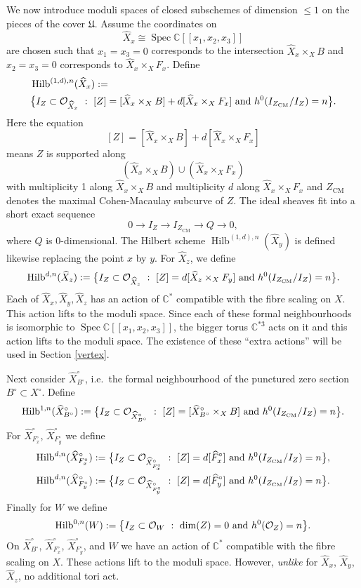 \documentclass{amsart}
\theoremstyle{definition}
\newcommand{\CC} {\mathbb{C}}          %
\renewcommand{\O}{\mathcal{O}}
\newcommand{\Hilb}{\operatorname{Hilb}}
\newcommand{\CM}{\operatorname{CM}}
\newcommand{\Spec}{\operatorname{Spec}}
\newcommand{\Xhat}{\widehat{X}}
\begin{document}
We now introduce moduli spaces of closed subschemes of dimension $\leq 1$ on the pieces of the cover $\mathfrak{U}$. Assume the coordinates on $$\Xhat _x \cong \Spec \CC[\![ x_1,x_2,x_3]\!]$$ are chosen such that $x_1=x_3=0$ corresponds to the intersection $\Xhat _x \times_X B$ and $x_2=x_3=0$ corresponds to $\Xhat _x \times_X F_x$. Define
\begin{align*}
&\Hilb^{(1,d),n}(\Xhat _x) := \\
&\big\{ I_Z \subset \O_{\Xhat _x} \ : \ [Z] = [\Xhat _x \times_X B] + d [\Xhat _x \times_X F_x] \ {\rm{and}} \ h^0(I_{Z_{\CM}} / I_Z) = n \big\}.
\end{align*}
Here the equation
$$
[Z] = [\Xhat _x \times_X B] + d [\Xhat _x \times_X F_x]
$$
means $Z$ is supported along $$(\Xhat _x \times_X B) \cup (\Xhat _x \times_X F_x)$$ with multiplicity 1 along $\Xhat _x \times_X B$ and multiplicity $d$ along $\Xhat _x \times_X F_x$ and $Z_{\CM}$ denotes the maximal Cohen-Macaulay subcurve of $Z$. The ideal sheaves fit into a short exact sequence
$$
0 \longrightarrow I_{Z} \longrightarrow I_{Z_{\CM}} \longrightarrow Q \longrightarrow 0, 
$$
where $Q$ is 0-dimensional. The Hilbert scheme $\Hilb^{(1,d),n}(\Xhat _y)$ is defined likewise replacing the point $x$ by $y$. For $\Xhat _z$, we define
$$
\Hilb^{d,n}(\Xhat _z) := \big\{ I_Z \subset \O_{\Xhat _z} \ : \ [Z] = d [\Xhat _z \times_X F_y] \ {\rm{and}} \ h^0(I_{Z_{\CM}} / I_Z) = n \big\}.
$$
Each of $\Xhat _x, \Xhat _y, \Xhat _z$ has an action of $\CC^*$ compatible with the fibre scaling on $X$. This action lifts to the moduli space. Since each of these formal neighbourhoods is isomorphic to $\Spec \CC[\![x_1,x_2,x_3]\!]$, the bigger torus $\CC^{*3}$ acts on it and this action lifts to the moduli space. The existence of these ``extra actions'' will be used in Section \ref{vertex}.

Next consider $\Xhat ^{\circ}_{B^\circ}$, i.e.~the formal neighbourhood of the punctured zero section $B^\circ \subset X^\circ$. Define
$$
\Hilb^{1,n}(\Xhat ^{\circ}_{B^\circ}) := \big\{ I_Z \subset \O_{\Xhat ^{\circ}_{B^\circ}} \ : \ [Z] = [\Xhat ^{\circ}_{B^\circ} \times_X B] \ {\rm{and}} \ h^0(I_{Z_{\CM}} / I_Z) = n \big\}.
$$
For $\Xhat ^{\circ}_{F_{x}^{\circ}}$, $\Xhat ^{\circ}_{F_{y}^{\circ}}$ we define
\begin{align*}
\Hilb^{d,n}(\Xhat ^{\circ}_{F_{x}^{\circ}}) &:= \big\{ I_Z \subset \O_{\Xhat ^{\circ}_{F_{x}^{\circ}}} \ : \ [Z] = d [\widehat{F}_{x}^{\circ}] \ {\rm{and}} \ h^0(I_{Z_{\CM}} / I_Z) = n \big\}, \\
\Hilb^{d,n}(\Xhat ^{\circ}_{F_{y}^{\circ}}) &:= \big\{ I_Z \subset \O_{\Xhat ^{\circ}_{F_{y}^{\circ}}} \ : \ [Z] = d [\widehat{F}_{y}^{\circ}] \ {\rm{and}} \ h^0(I_{Z_{\CM}} / I_Z) = n \big\}.
\end{align*}
Finally for $W$ we define
$$
\Hilb^{0,n}(W) := \big\{ I_Z \subset \O_{W} \ : \ \dim(Z) = 0 \ {\rm{and}} \ h^0(\O_Z) = n \big\}.
$$
On $\Xhat ^{\circ}_{B^\circ}$, $\Xhat ^{\circ}_{F_{x}^{\circ}}$, $\Xhat ^{\circ}_{F_{y}^{\circ}}$, and $W$ we have an action of $\CC^*$ compatible with the fibre scaling on $X$. These actions lift to the moduli space. However, \emph{unlike} for $\Xhat _x$, $\Xhat _y$, $\Xhat _z$, no additional tori act.
\end{document}
